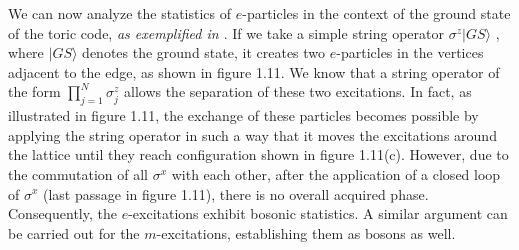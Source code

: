 \documentclass{Configuration_Files/PoliMi3i_thesis}
\begin{document}

We can now analyze the statistics of $e$-particles in the context of the ground state of the toric code, \textit{as exemplified in \cite{Rao16}}. If we take a simple string operator $\sigma^z|GS\rangle$ , where $|GS\rangle$ denotes the ground state, it creates two $e$-particles in the vertices adjacent to the edge, as shown in figure 1.11. We know that a string operator of the form $\prod_{j=1}^{N} \sigma_j^z$ allows the separation of these two excitations. In fact, as illustrated in figure 1.11, the exchange of these particles becomes possible by applying the string operator in such a way that it moves the excitations around the lattice until they reach configuration shown in figure 1.11(c). However, due to the commutation of all $\sigma^x$ with each other, after the application of a closed loop of $\sigma^x$ (last passage in figure 1.11), there is no overall acquired phase. Consequently, the $e$-excitations exhibit bosonic statistics. A similar argument can be carried out for the $m$-excitations, establishing them as bosons as well.
\end{document}
